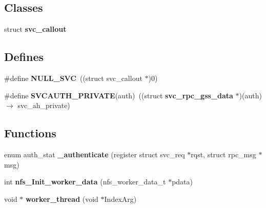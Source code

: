 \subsection*{Classes}
\begin{CompactItemize}
\item 
struct {\bf svc\_\-callout}
\end{CompactItemize}
\subsection*{Defines}
\begin{CompactItemize}
\item 
\#define {\bf NULL\_\-SVC}\ ((struct svc\_\-callout $\ast$)0)
\item 
\#define {\bf SVCAUTH\_\-PRIVATE}(auth)\ ((struct {\bf svc\_\-rpc\_\-gss\_\-data} $\ast$)(auth) $\rightarrow$ svc\_\-ah\_\-private)
\end{CompactItemize}
\subsection*{Functions}
\begin{CompactItemize}
\item 
enum auth\_\-stat {\bf \_\-authenticate} (register struct svc\_\-req $\ast$rqst, struct rpc\_\-msg $\ast$msg)
\item 
int {\bf nfs\_\-Init\_\-worker\_\-data} (nfs\_\-worker\_\-data\_\-t $\ast$pdata)
\item 
void $\ast$ {\bf worker\_\-thread} (void $\ast$Index\-Arg)
\end{CompactItemize}
